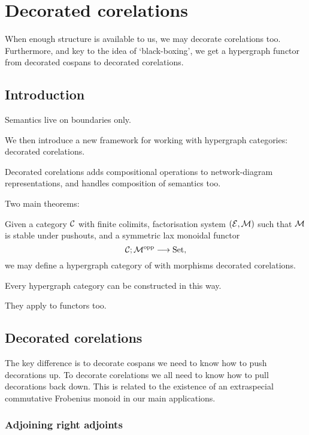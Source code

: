 \chapter{Decorated corelations}

When enough structure is available to us, we may decorate corelations too.
Furthermore, and key to the idea of `black-boxing', we get a hypergraph functor
from decorated cospans to decorated corelations.

\section{Introduction}

Semantics live on boundaries only.

We then introduce a new framework for working with hypergraph
categories: decorated corelations.

Decorated corelations adds compositional operations to network-diagram
representations, and handles composition of semantics too. 

Two main theorems: 
\begin{theorem}
Given a category $\mathcal C$ with finite colimits, factorisation system $(\mathcal E,\mathcal
M)$ such that $\mathcal M$ is stable under pushouts, and a symmetric lax monoidal functor 
\[
  \mathcal C; \mathcal M^{\mathrm{opp}} \longrightarrow \mathrm{Set},
\]
we may define a hypergraph category of with morphisms decorated corelations.
\end{theorem}

\begin{theorem}
Every hypergraph category can be constructed in this way.
\end{theorem}

They apply to functors too.

\section{Decorated corelations} \label{sec:dcorc}

The key difference is to decorate cospans we need to know how to push
decorations up. To decorate corelations we all need to know how to pull
decorations back down. This is related to the existence of an extraspecial
commutative Frobenius monoid in our main applications.



\subsection{Adjoining right adjoints}

